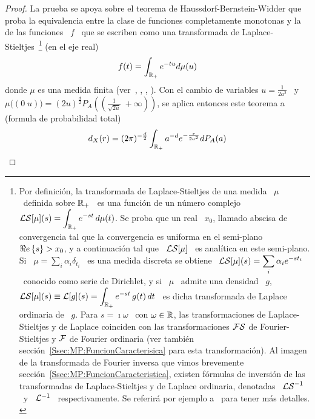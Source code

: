 \begin{proof}
  La prueba se apoya sobre el teorema de Haussdorf-Bernstein-Widder que proba la
  equivalencia entre la  clase de funciones completamente monotonas  y la de las
  funciones   \   $f$   \   que   se   escriben   como   una   transformada   de
  Laplace-Stieltjes~\footnote{Por     definici\'on,    la     transformada    de
    Laplace-Stieltjes de una medida \ $\mu$  \ definida sobre $\mathbb{R}_+$ \ es una
    funci\'on   de  un   n\'umero  complejo   \  $\displaystyle   \mathcal{LS}[\mu](s)  =
    \int_{\mathbb{R}_+} e^{-s t}  \, d\mu(t)$. Se proba que un  real \ $x_0$, llamado
    abscisa de convergencia tal que la convergencia es uniforma en el semi-plano
    \ $\Re e \left\{ s \right\} > x_0$, y a  continuaci\'on tal que \ $\displaystyle \mathcal{LS}[\mu]$ \
    es  anal\'itica  en este  semi-plano.   Si  \  $\displaystyle \mu  =  \sum_i
    \alpha_i \delta_{t_i}$ \ es una  medida discreta se obtiene \ $\displaystyle
    \mathcal{LS}[\mu](s)  =  \sum_i  \alpha_i  e^{-s  t_i}$  \  conocido  como  serie  de
    Dirichlet,  y  si  \ $\mu$  \  admite  una  densidad \  $g$,  $\displaystyle
    \mathcal{LS}[\mu](s) \equiv  \mathcal{L}[g](s) = \int_{\mathbb{R}_+} e^{-s  t} \, g(t) \,  dt$ \ es
    dicha transformada de Laplace ordinaria de  \ $g$.  Para $s = \imath \omega$
    \ con  $\omega \in  \mathbb{R}$, las transformaciones  de Laplace-Stieltjes  y de
    Laplace coinciden con las transformaciones $\mathcal{FS}$ de Fourier-Stieltjes y $\mathcal{F}$
    de           Fourier            ordinaria           (ver           tambi\'en
    secci\'on~\ref{Ssec:MP:FuncionCaracterisica} para esta transformaci\'on). Al
    imagen  de   la  transformada  de  Fourier  inversa   que  vimos  brevemente
    secci\'on~\ref{Ssec:MP:FuncionCaracteristica},    existen    f\'ormulas   de
    inversi\'on  de   las  transformadas  de  Laplace-Stieltjes   y  de  Laplace
    ordinaria, denotadas  \ $\mathcal{LS}^{-1}$  \ y \  $\mathcal{L}^{-1}$ \  respectivamente.  Se
    referir\'a     por    ejemplo     a~\cite{Wid46}     para    tener     m\'as
    detalles. \label{Foot:MP:LaplaceStieltjes}} (en el eje real)
  \[
  f(t) = \int_{\mathbb{R}_+} e^{-t u} d\mu(u)
  \]
  donde  $\mu$  es  una  medida finita  (ver~\cite[Teo.~3]{Sch38},  \cite{Ber29,
    Haus21:I, Haus21:II,  Wid32}, \cite[\S~12]{Wid46}, \cite[\S~XIII.4]{Fel71}).
  Con el  cambio de variables  $u = \frac{1}{2  a^2}$ \ y  \ $\mu\big( (0  \; u)
  \big) =  (2 u)^{\frac{d}{2}} P_A\left( \left( \frac{1}{\sqrt{2  u}} \; +\infty
    \right) \right)$, se aplica entonces este teorema a (formula de probabilidad
  total)
  \[
  d_X(r)  =  (2 \pi)^{-\frac{d}{2}} \int_{\mathbb{R}_+} a^{-d} e^{-\frac{r}{2 a^2}} dP_A(a) 
  \]


\end{proof}
